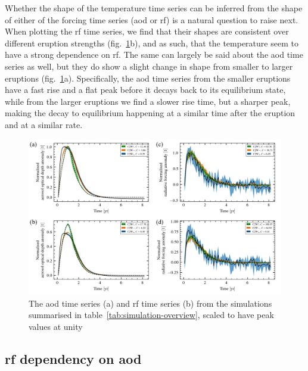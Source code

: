\documentclass{ametsocV6.1}
\begin{document}
Whether the shape of the temperature time series can be inferred from the shape of
either of the forcing time series (\gls{aod} or \gls{rf}) is a natural question to raise
next. When plotting the \gls{rf} time series, we find that their shapes are consistent
over different eruption strengths (fig.~\ref{fig:arrays_normalised}b), and as such, that
the temperature seem to have a strong dependence on \gls{rf}. The same can largely be
said about the \gls{aod} time series as well, but they do show a slight change in shape
from smaller to larger eruptions (fig.~\ref{fig:arrays_normalised}a). Specifically, the
\gls{aod} time series from the smaller eruptions have a fast rise and a flat peak before
it decays back to its equilibrium state, while from the larger eruptions we find a
slower rise time, but a sharper peak, making the decay to equilibrium happening at a
similar time after the eruption and at a similar rate.

\begin{figure}
  \centering
  \includegraphics[width=0.95\linewidth]{figures/figure2.png}

  \caption{The \gls{aod} time series (a) and \gls{rf} time series (b) from the simulations
    summarised in table~\ref{tab:simulation-overview}, scaled to have peak values at unity
  }\label{fig:arrays_normalised}
\end{figure}

\subsection{\gls{rf} dependency on \gls{aod}}
\end{document}
